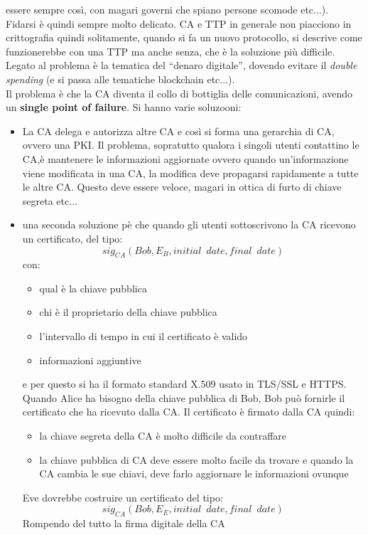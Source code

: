 \documentclass[a4paper,12pt, oneside]{book}
\begin{document}
essere sempre così, con magari governi che spiano persone scomode
etc$\ldots$). \\ 
Fidarsi è quindi sempre molto delicato. CA e TTP in generale non piacciono in
crittografia quindi solitamente, quando si fa un nuovo protocollo, si descrive
come funzionerebbe con una TTP ma anche senza, che è la soluzione più
difficile. Legato al problema è la tematica del ``denaro digitale'', dovendo
evitare il \textit{double spending} (e si passa alle tematiche blockchain
etc$\ldots$).\\   
Il problema è che la CA diventa il collo di bottiglia delle comunicazioni,
avendo un \textbf{single point of failure}. Si hanno varie soluzooni:
\begin{itemize}
  \item La CA delega e autorizza altre CA e così si forma una gerarchia di CA,
  ovvero una PKI. Il problema, sopratutto qualora i singoli utenti contattino le
  CA,è mantenere le informazioni aggiornate ovvero quando
  un'informazione viene modificata in una CA, la modifica deve propagarsi
  rapidamente a tutte le altre CA. Questo deve essere veloce, magari in ottica
  di furto di chiave segreta etc$\ldots$
  \item una seconda soluzione pè che quando gli utenti sottoscrivono la CA
  ricevono un certificato, del tipo:
  \[sig_{CA}(Bob, E_B, initial\,\,\, date, final\,\,\, date)\]
  con:
  \begin{itemize}
    \item qual è la chiave pubblica
    \item chi è il proprietario della chiave pubblica
    \item l'intervallo di tempo in cui il certificato è valido 
    \item informazioni aggiuntive
  \end{itemize}
  e per questo si ha il formato standard X.509 usato in TLS/SSL e HTTPS. Quando
  Alice ha bisogno della chiave pubblica di Bob, Bob può fornirle il certificato
  che ha ricevuto dalla CA. Il certificato è firmato dalla CA quindi:
  \begin{itemize}
    \item la chiave segreta della CA è molto difficile da contraffare
    \item la chiave pubblica di CA deve essere molto facile da trovare e quando
    la CA cambia le sue chiavi, deve farlo aggiornare le informazioni ovunque  
  \end{itemize}
  Eve dovrebbe costruire un certificato del tipo:
  \[sig_{CA}(Bob, E_E, initial\,\,\, date, final\,\,\, date)\]
  Rompendo del tutto la firma digitale della CA
\end{itemize}
\end{document}
